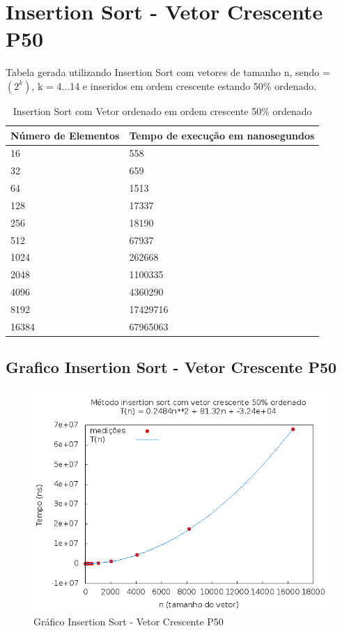 \documentclass[12pt,a4paper,twoside]{report}
\begin{document}
\section{Insertion Sort - Vetor Crescente P50}
Tabela gerada utilizando Insertion Sort com vetores de tamanho n, sendo = $(2^k)$, k = 4...14 e inseridos em ordem crescente estando 50\% ordenado.

\begin{table}[H]
\centering
\caption{Insertion Sort com Vetor ordenado em ordem crescente 50\% ordenado}
\label{my-label}
\begin{tabular}{|l|l|}
\hline
\multicolumn{1}{|c|}{\textbf{Número de Elementos}} & \multicolumn{1}{c|}{\textbf{Tempo de execução em nanosegundos}} \\ \hline
16 & 558 \\ \hline
32 & 659 \\ \hline
64 & 1513 \\ \hline
128 & 17337 \\ \hline
256 & 18190 \\ \hline
512 & 67937 \\ \hline
1024 & 262668 \\ \hline
2048 & 1100335 \\ \hline
4096 & 4360290 \\ \hline
8192 & 17429716 \\ \hline
16384 & 67965063 \\ \hline
\end{tabular}
\end{table}

\subsection{Grafico Insertion Sort - Vetor Crescente P50}
\begin{figure}[H]
    \centering
    \includegraphics[width=0.7\linewidth]{graficos/Insertion/vIntCrescenteP50/vIntCrescenteP50.png}
  \caption{Gráfico Insertion Sort - Vetor Crescente P50}
\end{figure}
\end{document}
